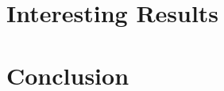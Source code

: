 \documentclass{article}
\begin{document}
\section{Interesting Results}
\section{Conclusion}
\end{document}
